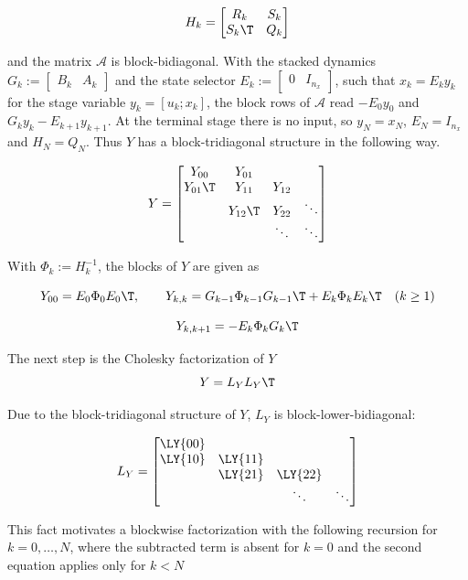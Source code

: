 \[
H_k = \begin{bmatrix} R_k & S_k \\ S_k\T & Q_k \end{bmatrix}
\]

and the matrix $\mathcal{A}$ is block-bidiagonal.
With the stacked dynamics $G_k := \begin{bmatrix} B_k & A_k \end{bmatrix}$ and the state selector $E_k := \begin{bmatrix} 0 & I_{n_x} \end{bmatrix}$, such that $x_k = E_k y_k$ for the stage variable $y_k = [u_k; x_k]$, the block rows of $\mathcal{A}$ read $-E_0 y_0$ and $G_k y_k - E_{k+1} y_{k+1}$.
At the terminal stage there is no input, so $y_N = x_N$, $E_N = I_{n_x}$ and $H_N = Q_N$.
Thus $Y$ has a block-tridiagonal structure in the following way.

\[
Y = 
\begin{bmatrix}
    Y_{00}   & Y_{01}    &        &        \\
    Y_{01}\T & Y_{11}    & Y_{12} &        \\
             & Y_{12}\T  & Y_{22} & \ddots \\
             &           & \ddots & \ddots
\end{bmatrix}
\]

With $\Phi_k := H_k^{-1}$, the blocks of $Y$ are given as

\[
Y_{00} = E_0 \Phi_0 E_0\T, \qquad
Y_{k,k} = G_{k-1} \Phi_{k-1} G_{k-1}\T + E_k \Phi_k E_k\T \quad (k \geq 1)
\]

\[
Y_{k,k+1} = -E_k \Phi_k G_k\T
\]

The next step is the Cholesky factorization of $Y$
\[
Y = L_Y L_Y\T
\]

Due to the block-tridiagonal structure of $Y$, $L_Y$ is block-lower-bidiagonal:

\[
L_Y =
\begin{bmatrix}
    \LY{00} &         &         & \\
    \LY{10} & \LY{11} &         & \\
            & \LY{21} & \LY{22} & \\
           &        & \ddots & \ddots
\end{bmatrix}
\]

This fact motivates a blockwise factorization with the following recursion for $k = 0, \dots, N$, where the subtracted term is absent for $k = 0$ and the second equation applies only for $k < N$

